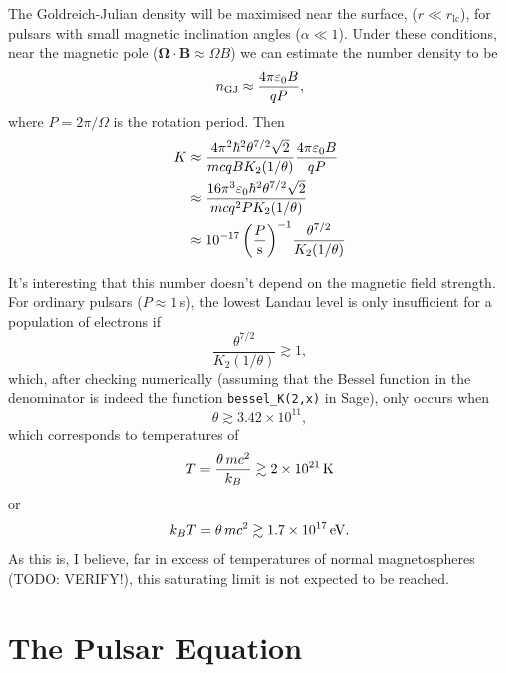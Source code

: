 \documentclass{book}
\newcommand{\todo}[1]{{\color{red}TODO: {#1}}}
\newcommand{\rL}{r_\text{lc}} %
\newcommand{\nGJ}{n_{\rm GJ}}
\begin{document}
The Goldreich-Julian density will be maximised near the surface, ($r \ll \rL$), for pulsars with small magnetic inclination angles ($\alpha \ll 1$).
Under these conditions, near the magnetic pole (${\bm \Omega}\cdot{\bm B} \approx \Omega B$) we can estimate the number density to be
\begin{equation}
  \nGJ \approx \frac{4\pi\varepsilon_0 B}{qP},
\end{equation}
where $P = 2\pi/\Omega$ is the rotation period.
Then
\begin{equation}
  \begin{aligned}
    K &\approx \frac{4\pi^2 \hbar^2 \theta^{7/2} \sqrt{2}}{mcqB K_2(1/\theta)} \frac{4\pi\varepsilon_0 B}{qP} \\
      &\approx \frac{16\pi^3 \varepsilon_0 \hbar^2 \theta^{7/2} \sqrt{2}}{mcq^2 P K_2(1/\theta)} \\
      &\approx 10^{-17} \, \bigg(\frac{P}{\rm s} \bigg)^{-1} \frac{\theta^{7/2}}{K_2(1/\theta)}
  \end{aligned}
\end{equation}

It's interesting that this number doesn't depend on the magnetic field strength.
For ordinary pulsars ($P \approx 1\,$s), the lowest Landau level is only insufficient for a population of electrons if
\begin{equation}
  \frac{\theta^{7/2}}{K_2(1/\theta)} \gtrsim 1,
\end{equation}
which, after checking numerically (assuming that the Bessel function in the denominator is indeed the function \texttt{bessel\_K(2,x)} in Sage), only occurs when
\begin{equation}
  \theta \gtrsim 3.42 \times 10^{11},
\end{equation}
which corresponds to temperatures of
\begin{equation}
  T = \frac{\theta \, mc^2}{k_B}
    \gtrsim 2 \times 10^{21}\,{\rm K}
\end{equation}
or
\begin{equation}
  k_B T = \theta\,mc^2
    \gtrsim 1.7 \times 10^{17}\,{\rm eV}.
\end{equation}
As this is, I believe, far in excess of temperatures of normal magnetospheres (\todo{VERIFY!}), this saturating limit is not expected to be reached.

\section{The Pulsar Equation}
\end{document}

